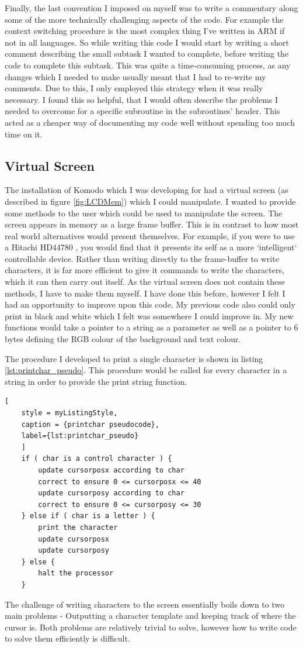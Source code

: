 Finally, the last convention I imposed on myself was to write a commentary along some of the more technically challenging aspects of the code. For example the context switching procedure is the most complex thing I've written in ARM if not in all languages. So while writing this code I would start by writing a short comment describing the small subtask I wanted to complete, before  writing the code to complete this subtask. This was quite a time-consuming process, as any changes which I needed to make usually meant that I had to re-write my comments. Due to this, I only employed this strategy when it was really necessary. I found this so helpful, that I would often describe the problems I needed to overcome for a specific subroutine in the subroutines' header. This acted as a cheaper way of documenting my code well without spending too much time on it. 
\subsection{Virtual Screen}
The installation of Komodo which I was developing for had a virtual screen (as described in figure \ref{fig:LCDMem}) which I could manipulate. I wanted to provide some methods to the user which could be used to manipulate the screen. The screen appears in memory as a large frame buffer. This is in contrast to how most real world alternatives would present themselves. For example, if you were to use a Hitachi HD44780 \cite{datasheet}, you would find that it presents its self as a more `intelligent` controllable device. Rather than writing directly to the frame-buffer to write characters, it is far more efficient to give it commands to write the characters, which it can then carry out itself. As the virtual screen does not contain these methods, I have to make them myself. I have done this before, however I felt I had an opportunity to improve upon this code. My previous code also could only print in black and white which I felt was somewhere I could improve in. My new functions would take a pointer to a string as a parameter as well as a pointer to 6 bytes defining the RGB colour of the background and text colour. 


The procedure I developed to print a single character is shown in listing \ref{lst:printchar_pseudo}. This procedure would be called for every character in a string in order to provide the print string function. 
\begin{lstlisting}[
	style = myListingStyle,
	caption = {printchar pseudocode},
	label={lst:printchar_pseudo}	
	]
	if ( char is a control character ) {	
		update cursorposx according to char
		correct to ensure 0 <= cursorposx <= 40
		update cursorposy according to char
		correct to ensure 0 <= cursorposy <= 30
	} else if ( char is a letter ) {
		print the character
		update cursorposx
		update cursorposy
	} else {
		halt the processor
	}
\end{lstlisting}
The challenge of writing characters to the screen essentially boils down to two main problems - Outputting a character template and keeping track of where the cursor is. Both problems are relatively trivial to solve, however how to write code to solve them efficiently is difficult.
